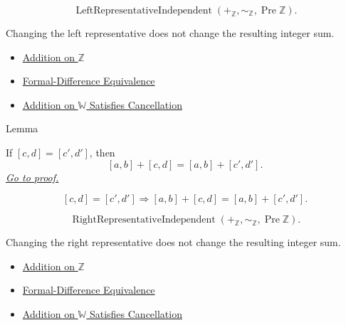 \begin{remark*}
\[
\operatorname{LeftRepresentativeIndependent}(+_{\mathbb{Z}},\sim_{\mathbb{Z}},\operatorname{Pre}\mathbb{Z}).
\]
\end{remark*}

\begin{remark*}[Interpretation]
Changing the left representative does not change the resulting integer sum.
\end{remark*}

\begin{dependencies}
\begin{itemize}
  \item \hyperref[def:addition-on-z-classes]{Addition on $\mathbb{Z}$}
  \item \hyperref[def:formal-difference-equivalence]{Formal-Difference Equivalence}
  \item \hyperref[thm:addition-on-w-cancellation]{Addition on $\mathbb{W}$ Satisfies Cancellation}
\end{itemize}
\end{dependencies}

\begin{lemmabox}{Lemma}
\begin{lemma}
\label{lem:addition-on-z-classes-respects-right-equivalence}
If $[c,d]=[c',d']$, then
\[
[a,b]+[c,d]=[a,b]+[c',d'].
\]
\hyperref[prf:addition-on-z-classes-respects-right-equivalence]{\textit{Go to proof.}}
\end{lemma}
\end{lemmabox}

\begin{remark*}
\[
[c,d]=[c',d']
\Longrightarrow
[a,b]+[c,d]=[a,b]+[c',d'].
\]
\end{remark*}

\begin{remark*}
\[
\operatorname{RightRepresentativeIndependent}(+_{\mathbb{Z}},\sim_{\mathbb{Z}},\operatorname{Pre}\mathbb{Z}).
\]
\end{remark*}

\begin{remark*}[Interpretation]
Changing the right representative does not change the resulting integer sum.
\end{remark*}

\begin{dependencies}
\begin{itemize}
  \item \hyperref[def:addition-on-z-classes]{Addition on $\mathbb{Z}$}
  \item \hyperref[def:formal-difference-equivalence]{Formal-Difference Equivalence}
  \item \hyperref[thm:addition-on-w-cancellation]{Addition on $\mathbb{W}$ Satisfies Cancellation}
\end{itemize}
\end{dependencies}


